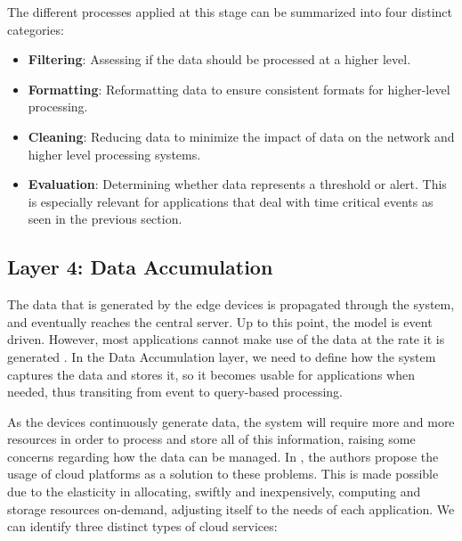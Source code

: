 The different processes applied at this stage can be summarized into four distinct categories:

\begin{itemize}
    \item \textbf{Filtering}: Assessing if the data should be processed at a higher level. 
    \item \textbf{Formatting}: Reformatting data to ensure consistent formats for higher-level processing.
    \item \textbf{Cleaning}: Reducing data to minimize the impact of data on the network and higher level processing systems.
    \item \textbf{Evaluation}: Determining whether data represents a threshold or alert. This is especially relevant for applications that deal with time critical events as seen in the previous section.
\end{itemize}


\subsection{Layer 4: Data Accumulation}
\label{sec:iot-model-layer4}

The data that is generated by the edge devices is propagated through the system, and eventually reaches the central server. Up to this point, the model is event driven. However, most applications cannot make use of the data at the rate it is generated \cite{10.5555/3161403}. In the Data Accumulation layer, we need to define how the system captures the data and stores it, so it becomes usable for applications when needed, thus transiting from event to query-based processing. \bigskip

As the devices continuously generate data, the system will require more and more resources in order to process and store all of this information, raising some concerns regarding how the data can be managed. In \cite{Doukas2012}, the authors propose the usage of cloud platforms as a solution to these problems. This is made possible due to the elasticity in allocating, swiftly and inexpensively, computing and storage resources on-demand, adjusting itself to the needs of each application. We can identify three distinct types of cloud services: 

